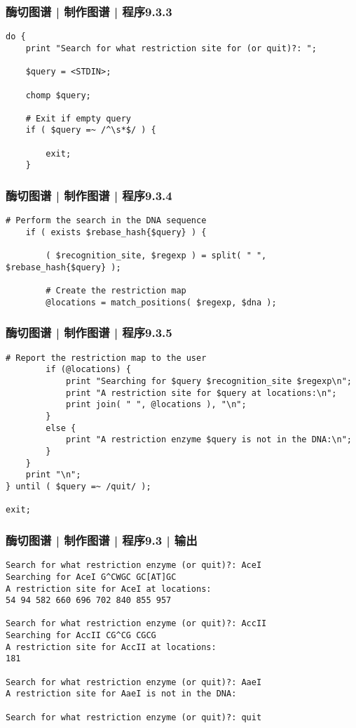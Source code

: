 \begin{frame}[fragile]
  \frametitle{酶切图谱 | 制作图谱 | 程序9.3.3}
\begin{lstlisting}[firstnumber=27]
do {
    print "Search for what restriction site for (or quit)?: ";

    $query = <STDIN>;

    chomp $query;

    # Exit if empty query
    if ( $query =~ /^\s*$/ ) {

        exit;
    }
\end{lstlisting}
\end{frame}

\begin{frame}[fragile]
  \frametitle{酶切图谱 | 制作图谱 | 程序9.3.4}
\begin{lstlisting}[firstnumber=40]
    # Perform the search in the DNA sequence
    if ( exists $rebase_hash{$query} ) {

        ( $recognition_site, $regexp ) = split( " ", $rebase_hash{$query} );

        # Create the restriction map
        @locations = match_positions( $regexp, $dna );
\end{lstlisting}
\end{frame}

\begin{frame}[fragile]
  \frametitle{酶切图谱 | 制作图谱 | 程序9.3.5}
\begin{lstlisting}[firstnumber=48,basicstyle=\small\tt,numberstyle=\footnotesize]
        # Report the restriction map to the user
        if (@locations) {
            print "Searching for $query $recognition_site $regexp\n";
            print "A restriction site for $query at locations:\n";
            print join( " ", @locations ), "\n";
        }
        else {
            print "A restriction enzyme $query is not in the DNA:\n";
        }
    }
    print "\n";
} until ( $query =~ /quit/ );

exit;
\end{lstlisting}
\end{frame}

\begin{frame}[fragile]
  \frametitle{酶切图谱 | 制作图谱 | 程序9.3 | 输出}
\begin{lstlisting}[basicstyle=\footnotesize\tt,numberstyle=\scriptsize]
Search for what restriction enzyme (or quit)?: AceI
Searching for AceI G^CWGC GC[AT]GC
A restriction site for AceI at locations:
54 94 582 660 696 702 840 855 957

Search for what restriction enzyme (or quit)?: AccII
Searching for AccII CG^CG CGCG
A restriction site for AccII at locations:
181

Search for what restriction enzyme (or quit)?: AaeI
A restriction site for AaeI is not in the DNA:

Search for what restriction enzyme (or quit)?: quit
\end{lstlisting}
\end{frame}

